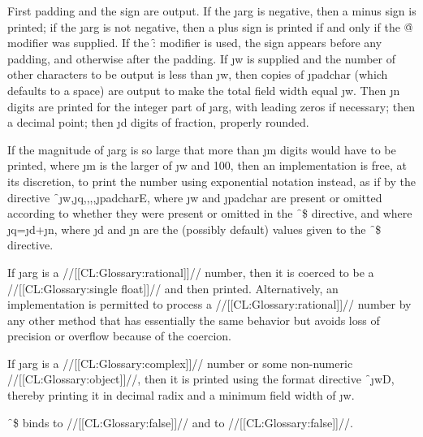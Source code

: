 First padding and the sign are output. If the \j{arg} is negative, then a minus sign is printed; if the \j{arg} is not negative, then a plus sign is printed if and only if the \f{@} modifier was supplied.   If the \f{:} modifier is used, the sign appears before any padding, and otherwise after the padding. If \j{w} is supplied and the number of other characters to be output is less than \j{w}, then copies of \j{padchar} (which defaults to a space) are output to make the total field width equal \j{w}. Then \j{n} digits are printed for the integer part of \j{arg}, with leading zeros if necessary; then a decimal point; then \j{d} digits of fraction, properly rounded.

If the magnitude of \j{arg} is so large that more than \j{m} digits would have to be printed, where \j{m} is the larger of \j{w} and 100, then an implementation is free, at its discretion, to print the number using exponential notation instead, as if by the directive \f{~\j{w},\j{q},,,,\j{padchar}E}, where \j{w} and \j{padchar} are present or omitted according to whether they were present or omitted in the \f{~\$} directive, and where \j{q}=\j{d}+\j{n}, where \j{d} and \j{n} are the (possibly default) values given to the \f{~\$} directive.

If \j{arg} is a //[[CL:Glossary:rational]]//  number, then it is coerced to be a //[[CL:Glossary:single float]]// and then printed.  Alternatively, an implementation is permitted to process a //[[CL:Glossary:rational]]// number by any  other method that has essentially the same behavior but avoids loss of precision or overflow because of the coercion.

If \j{arg} is a //[[CL:Glossary:complex]]// number or some non-numeric //[[CL:Glossary:object]]//, then it is printed using the format directive \f{~\j{w}D}, thereby printing it in decimal radix and a minimum field width of \j{w}.

 \f{~\$} binds  to //[[CL:Glossary:false]]// 
 and  to //[[CL:Glossary:false]]//.

\endsubsubsection%

\endsubsection%

 

 

